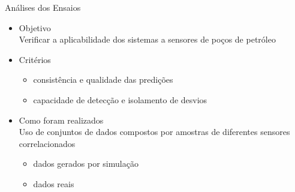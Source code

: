 \documentclass{beamer}
\begin{document}
\begin{frame}{Análises dos Ensaios}

    \begin{itemize}
        \item Objetivo\\
            Verificar a \alert{aplicabilidade} dos sistemas a sensores de poços de petróleo
            \vspace{10pt}

        \item Critérios
            \begin{itemize}
                \item \alert{consistência} e \alert{qualidade} das predições
                \item capacidade de \alert{detecção} e \alert{isolamento} de desvios
            \end{itemize}
            \vspace{10pt}

        \item Como foram realizados\\
            Uso de conjuntos de dados compostos por amostras de diferentes
            \alert{sensores correlacionados}
            \begin{itemize}
                \item dados gerados por simulação
                \item dados reais
            \end{itemize}

    \end{itemize}

    
\end{frame}
\end{document}
